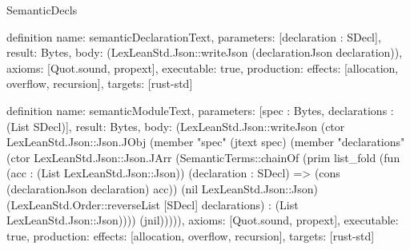 \begin{lexlean}{SemanticDecls}
\begin{semanticmodule}
definition{
  name: semanticDeclarationText,
  parameters: [declaration : SDecl],
  result: Bytes,
  body: (LexLeanStd.Json::writeJson (declarationJson declaration)),
  axioms: [Quot.sound, propext],
  executable: true,
  production: {effects: [allocation, overflow, recursion], targets: [rust-std]}
}

definition{
  name: semanticModuleText,
  parameters: [spec : Bytes, declarations : (List SDecl)],
  result: Bytes,
  body: (LexLeanStd.Json::writeJson (ctor LexLeanStd.Json::Json.JObj (member "spec" (jtext spec) (member "declarations" (ctor LexLeanStd.Json::Json.JArr (SemanticTerms::chainOf (prim list_fold (fun (acc : (List LexLeanStd.Json::Json)) (declaration : SDecl) => (cons (declarationJson declaration) acc)) (nil LexLeanStd.Json::Json) (LexLeanStd.Order::reverseList [SDecl] declarations) : (List LexLeanStd.Json::Json)))) (jnil))))),
  axioms: [Quot.sound, propext],
  executable: true,
  production: {effects: [allocation, overflow, recursion], targets: [rust-std]}
}
\end{semanticmodule}
\end{lexlean}
